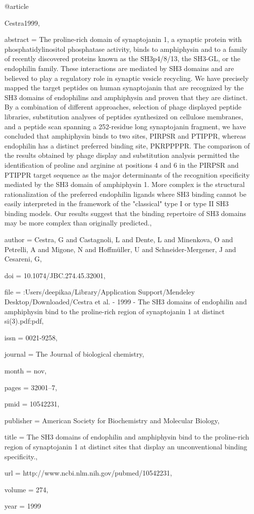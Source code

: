 @article{Cestra1999,

abstract = {The proline-rich domain of synaptojanin 1, a synaptic protein with phosphatidylinositol phosphatase activity, binds to amphiphysin and to a family of recently discovered proteins known as the SH3p4/8/13, the SH3-GL, or the endophilin family. These interactions are mediated by SH3 domains and are believed to play a regulatory role in synaptic vesicle recycling. We have precisely mapped the target peptides on human synaptojanin that are recognized by the SH3 domains of endophilins and amphiphysin and proven that they are distinct. By a combination of different approaches, selection of phage displayed peptide libraries, substitution analyses of peptides synthesized on cellulose membranes, and a peptide scan spanning a 252-residue long synaptojanin fragment, we have concluded that amphiphysin binds to two sites, PIRPSR and PTIPPR, whereas endophilin has a distinct preferred binding site, PKRPPPPR. The comparison of the results obtained by phage display and substitution analysis permitted the identification of proline and arginine at positions 4 and 6 in the PIRPSR and PTIPPR target sequence as the major determinants of the recognition specificity mediated by the SH3 domain of amphiphysin 1. More complex is the structural rationalization of the preferred endophilin ligands where SH3 binding cannot be easily interpreted in the framework of the "classical" type I or type II SH3 binding models. Our results suggest that the binding repertoire of SH3 domains may be more complex than originally predicted.},

author = {Cestra, G and Castagnoli, L and Dente, L and Minenkova, O and Petrelli, A and Migone, N and Hoffm{\"{u}}ller, U and Schneider-Mergener, J and Cesareni, G},

doi = {10.1074/JBC.274.45.32001},

file = {:Users/deepikaa/Library/Application Support/Mendeley Desktop/Downloaded/Cestra et al. - 1999 - The SH3 domains of endophilin and amphiphysin bind to the proline-rich region of synaptojanin 1 at distinct si(3).pdf:pdf},

issn = {0021-9258},

journal = {The Journal of biological chemistry},

month = {nov},

pages = {32001--7},

pmid = {10542231},

publisher = {American Society for Biochemistry and Molecular Biology},

title = {{The SH3 domains of endophilin and amphiphysin bind to the proline-rich region of synaptojanin 1 at distinct sites that display an unconventional binding specificity.}},

url = {http://www.ncbi.nlm.nih.gov/pubmed/10542231},

volume = {274},

year = {1999}

}

